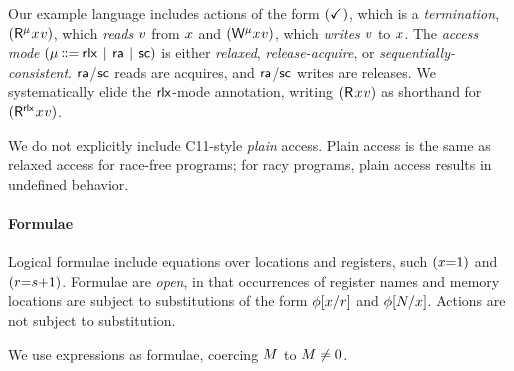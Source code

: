   Our example language includes actions of the form $(\checkmark_{})$, which is a
  \emph{termination}, $(\DR[\amode][\aThrd]{\aLoc}{\aVal})$, which
  \emph{reads} $v$ from $x$ and
  $(\DW[\amode][\aThrd]{\aLoc}{\aVal})$, which \emph{writes} $v$ to
  $x$.
The \emph{access mode} $(\amode \!\!\BNFDEF\!\! \modeRLX \!\BNFSEP\! \modeRA \!\BNFSEP\! \modeSC)$ is
either \emph{relaxed}, \emph{release-acquire}, or
\emph{sequentially-consistent}.
${\mathsf{ra}}$/${\mathsf{sc}}$ reads are acquires, and ${\mathsf{ra}}$/${\mathsf{sc}}$ writes are releases.
We systematically elide the ${\mathsf{rlx}}$-mode annotation, writing $(\DR{\aLoc}{\aVal})$
as shorthand for $(\DR[\modeRLX]{\aLoc}{\aVal})$.

We do not explicitly include C11-style \emph{plain} access.  Plain access is
the same as relaxed access for race-free programs; for racy programs, plain
access results in undefined behavior.




\paragraph{Formulae} Logical formulae include equations over locations and registers, such
$(x{=}1)$ and $(r{=}s{+}1)$.  Formulae are \emph{open}, in that
occurrences of register names and memory locations are subject to
substitutions of the form $\phi[x/r]$ and $\phi[N/x]$.
Actions are not subject to substitution.

We use expressions as formulae, coercing $M$ to $M\neq 0$.

